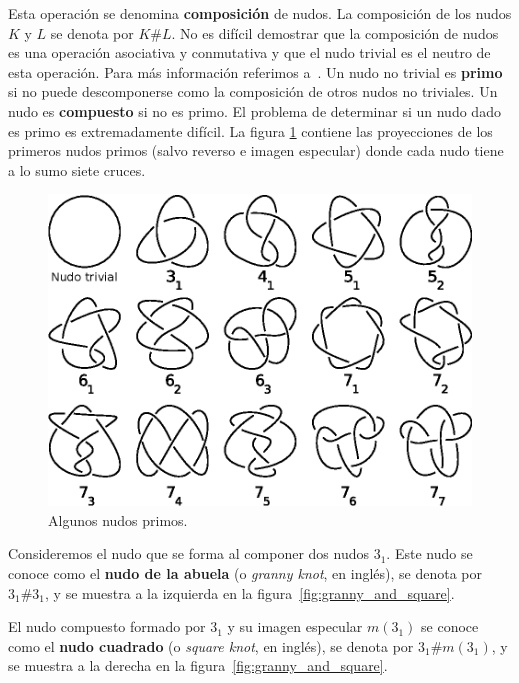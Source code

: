\documentclass[graybox]{svmult}
\begin{document}
Esta operación se denomina \textbf{composición} de nudos. La composición de los
nudos $K$ y $L$ se denota por $K\#L$. No es difícil demostrar que la
composición de nudos es una operación asociativa y conmutativa y que el nudo
trivial es el neutro de esta operación.  Para más información referimos
a~\cite[\S1.2]{MR2079925}.  Un nudo no trivial es \textbf{primo} si no puede
descomponerse como la composición de otros nudos no triviales. Un nudo es
\textbf{compuesto} si no es primo.  El problema de determinar si un nudo dado
es primo es extremadamente difícil.  La figura \ref{fig:knots} contiene las
proyecciones de los primeros nudos primos (salvo reverso e imagen especular)
donde cada nudo tiene a lo sumo siete cruces. 
\begin{figure}[h]
	\centering
	\includegraphics[scale=0.7]{images/knots}
	\caption{Algunos nudos primos.}
	\label{fig:knots}
\end{figure}

\begin{example}
	Consideremos el nudo que se forma al componer dos nudos $3_1$. Este nudo se
	conoce como el \textbf{nudo de la abuela} (o \emph{granny knot}, en
	inglés), se denota por $3_1\#3_1$, y se muestra a la izquierda en la
	figura~\ref{fig:granny_and_square}.  
\end{example}

\begin{example}
    El nudo compuesto formado por $3_1$ y su imagen especular $m(3_1)$ se conoce
    como el \textbf{nudo cuadrado} (o \emph{square knot}, en inglés), se denota
    por $3_1\#m(3_1)$, y se muestra a la derecha en la
    figura~\ref{fig:granny_and_square}. 
\end{example}
    
\end{document}
